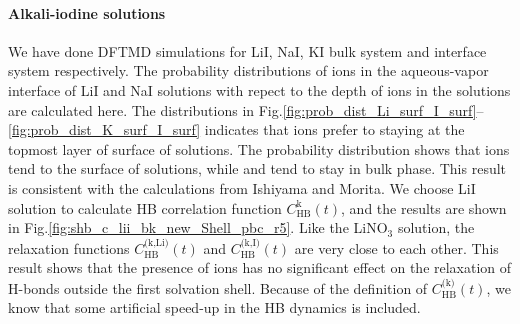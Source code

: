 \paragraph{Alkali-iodine solutions}
% 
We have done DFTMD simulations for LiI, NaI, KI bulk system and interface system respectively.
The probability distributions of ions in the aqueous-vapor interface of LiI and NaI solutions with repect to the depth 
of ions in the solutions %
are calculated here. 
The distributions in Fig.\thinspace\ref{fig:prob_dist_Li_surf_I_surf}--\ref{fig:prob_dist_K_surf_I_surf} indicates 
that \I ions prefer to staying at the topmost layer of surface of solutions.
The probability distribution shows that \I ions tend to the surface of solutions, while \Na and \Li tend to stay in bulk phase. 
This result is consistent with the calculations from Ishiyama and Morita\cite{TI07,Ishiyama2014}.
We choose LiI solution to calculate HB correlation function $C^\text{k}_\text{HB}(t)$,
and the results are shown in Fig.\ref{fig:shb_c_lii_bk_new_Shell_pbc_r5}. 
Like the LiNO$_3$ solution, the relaxation functions $C^\text{(k,Li)}_\text{HB}(t)$ and 
$C^\text{(k,I)}_\text{HB}(t)$ are very close to each other. 
This result shows that the presence of ions has no significant effect on the relaxation of H-bonds outside the first solvation shell.
Because of the definition of $C^\text{(k)}_\text{HB}(t)$, 
we know that some artificial speed-up in the HB dynamics is included. 

